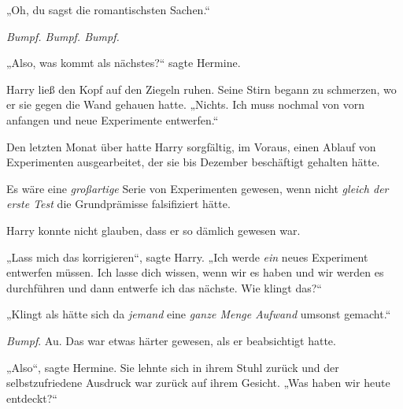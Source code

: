 „Oh, du sagst die romantischsten Sachen.“

\emph{Bumpf. Bumpf. Bumpf.}

„Also, was kommt als nächstes?“ sagte Hermine.

Harry ließ den Kopf auf den Ziegeln ruhen. Seine Stirn begann zu schmerzen, wo er sie gegen die Wand gehauen hatte. „Nichts. Ich muss nochmal von vorn anfangen und neue Experimente entwerfen.“

Den letzten Monat über hatte Harry sorgfältig, im Voraus, einen Ablauf von Experimenten ausgearbeitet, der sie bis Dezember beschäftigt gehalten hätte.

Es wäre eine \emph{großartige} Serie von Experimenten gewesen, wenn nicht \emph{gleich der erste Test} die Grundprämisse falsifiziert hätte.

Harry konnte nicht glauben, dass er so dämlich gewesen war.

„Lass mich das korrigieren“, sagte Harry. „Ich werde \emph{ein} neues Experiment entwerfen müssen. Ich lasse dich wissen, wenn wir es haben und wir werden es durchführen und dann entwerfe ich das nächste. Wie klingt das?“

„Klingt als hätte sich da \emph{jemand} eine \emph{ganze Menge Aufwand} umsonst gemacht.“

\emph{Bumpf}. Au. Das war etwas härter gewesen, als er beabsichtigt hatte.

„Also“, sagte Hermine. Sie lehnte sich in ihrem Stuhl zurück und der selbstzufriedene Ausdruck war zurück auf ihrem Gesicht. „Was haben wir heute entdeckt?“

